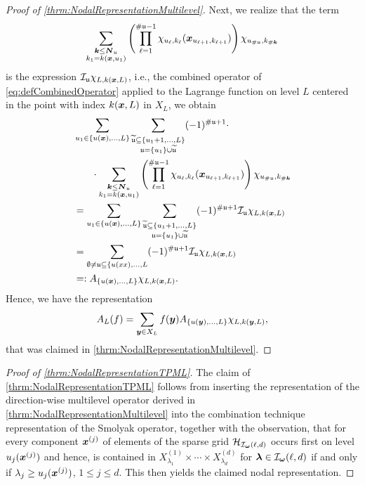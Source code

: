 \documentclass[	a4paper, 
								11pt]{article}
\theoremstyle{plain}
\begin{document}
\begin{proof}[Proof of \cref{thrm:NodalRepresentationMultilevel}]
Next, we realize that the term 
\begin{align*}
    \sum_{\substack{\boldsymbol{k} \leq \boldsymbol{N}_{\mathfrak{u}} \\ k_1 = k(\boldsymbol{x},u_1)}} \left( \prod_{\ell=1}^{\# \mathfrak{u} - 1} \chi_{u_{\ell},k_{\ell}} ( \boldsymbol{x}_{u_{\ell + 1},k_{\ell+1}} ) \right) \chi_{u_{\# \mathfrak{u}}, k_{\# \boldsymbol{k}}}
\end{align*}
is the expression $ \mathcal{I}_{\mathfrak{u}} \chi_{L,k(\boldsymbol{x},L)}$, i.e., the combined operator of \eqref{eq:defCombinedOperator} applied to the Lagrange function on level $ L $ centered in the point with index $ k(\boldsymbol{x},L) $ in $ X_L $, we obtain
\begin{align*}
    &\sum_{u_1 \in \{u(\boldsymbol{x}), \dots, L \}} \sum_{\substack{\widetilde{\mathfrak{u}} \subseteq \{u_1 + 1, \dots, L\} \\ \mathfrak{u} = \{u_1\} \cup \widetilde{\mathfrak{u}}}} (-1)^{\# \mathfrak{u} + 1} \cdot \\
    &\phantom{3em} \cdot \sum_{\substack{\boldsymbol{k} \leq \boldsymbol{N}_{\mathfrak{u}} \\ k_1 = k(\boldsymbol{x},u_1)}} \left( \prod_{\ell=1}^{\# \mathfrak{u} - 1} \chi_{u_{\ell},k_{\ell}} ( \boldsymbol{x}_{u_{\ell + 1},k_{\ell+1}} ) \right) \chi_{u_{\# \mathfrak{u}}, k_{\# \boldsymbol{k}}} \\
    &= \sum_{u_1 \in \{u(\boldsymbol{x}), \dots, L \}} \sum_{\substack{\widetilde{\mathfrak{u}} \subseteq \{u_1 + 1, \dots, L\} \\ \mathfrak{u} = \{u_1\} \cup \widetilde{\mathfrak{u}}}} (-1)^{\# \mathfrak{u} + 1} \mathcal{I}_{\mathfrak{u}} \chi_{L,k(\boldsymbol{x},L)} \\
    &= \sum_{\emptyset \neq \mathfrak{u} \subseteq \{u(xx), \dots, L} (-1)^{\# \mathfrak{u} + 1} \mathcal{I}_{\mathfrak{u}} \chi_{L,k(\boldsymbol{x},L)} \\
    &=: A_{\{ u(\boldsymbol{x}), \dots, L\}} \chi_{L,k(\boldsymbol{x},L)}.
\end{align*}
Hence, we have the representation
\begin{align*}
    A_L(f) = \sum_{\boldsymbol{y} \in X_L} f(\boldsymbol{y}) A_{\{ u(\boldsymbol{y}), \dots, L\}} \chi_{L,k(\boldsymbol{y},L)},
\end{align*}
that was claimed in \cref{thrm:NodalRepresentationMultilevel}.
\end{proof}


\begin{proof}[Proof of \cref{thrm:NodalRepresentationTPML}]
The claim of \cref{thrm:NodalRepresentationTPML} follows from inserting the representation of the direction-wise multilevel operator derived in \cref{thrm:NodalRepresentationMultilevel} into the combination technique representation of the Smolyak operator, together with the observation, that for every component $ \boldsymbol{x}^{(j)} $ of elements of the sparse grid $ \mathcal{H}_{\mathcal{I}_{\boldsymbol{\omega}}(\ell,d)} $ occurs first on level $ u_j(\boldsymbol{x}^{(j)}) $ and hence, is contained in $ X^{(1)}_{\lambda_1} \times \cdots \times X^{(d)}_{\lambda_d} $ for $ \boldsymbol{\lambda} \in \mathcal{I}_{\boldsymbol{\omega}}(\ell,d) $ if and only if $ \lambda_j \geq u_j(\boldsymbol{x}^{(j)}) $, $1 \leq j \leq d $. This then yields the claimed nodal representation.
\end{proof}
%
%
%
%
%
%

\newpage
\printbibliography
\end{document}
